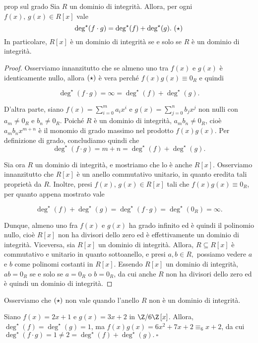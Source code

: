 \begin{prop}[]{prop sul grado}
Sia $R$ un dominio di integrità. Allora, per ogni $f(x),\,g(x)\in R[x]$ vale \[\deg^{\star}(f\cdot g)=\deg^{\star}(f)+\deg^{\star}(g). \ \bf{(\star)}\] In particolare, $R[x]$ è un dominio di integrità se e solo se $R$ è un dominio di integrità.
\end{prop}
\vspace{-4mm}
\begin{proof} Osserviamo innanzitutto che se almeno uno tra $f(x)$ e $g(x)$ è identicamente nullo, 
allora $\bf{(\star)}$ è vera perché $f(x)g(x)\equiv 0_R$ e quindi 

\[\deg^{\star}(f\cdot g)=\infty=\deg^{\star}(f)+\deg^{\star}(g).\] 

\noindent D'altra parte, siano $f(x)=\sum\limits_{i=0}^m a_i x^i$ e $g(x)=\sum\limits_{j=0}^n b_j x^j$ 
non nulli con $a_m\neq 0_R$ e $b_n\neq 0_R$. Poiché $R$ è un dominio di integrità, $a_m b_n\neq 0_R$, 
cioè $a_m b_n x^{m+n}$ è il monomio di grado massimo nel prodotto $f(x)g(x)$. Per definizione di grado, 
concludiamo quindi che \[\deg^{\star}(f\cdot g)=m+n=\deg^{\star}(f)+\deg^{\star}(g).\]

\noindent Sia ora $R$ un dominio di integrità, e mostriamo che lo è anche $R[x]$. 
Osserviamo innanzitutto che $R[x]$ è un anello commutativo unitario, in quanto eredita tali proprietà da $R$. 
Inoltre, presi $f(x),\,g(x)\in R[x]$ tali che $f(x)g(x)\equiv 0_R$, per quanto appena mostrato vale 

\[\deg^{\star}(f)+\deg^{\star}(g)=\deg^{\star}(f\cdot g)=\deg^{\star}(0_R)=\infty.\] 

\noindent Dunque, almeno uno fra $f(x)$ e $g(x)$ ha grado infinito ed è quindi il polinomio nullo, 
cioè $R[x]$ non ha divisori dello zero ed è effettivamente un dominio di integrità.
\vspace{1mm}
\noindent Viceversa, sia $R[x]$ un dominio di integrità. Allora, $R\subseteq R[x]$ è commutativo e unitario in quanto sottoanello, 
e presi $a,b\in R,$ possiamo vedere $a$ e $b$ come polinomi costanti in $R[x]$. Essendo $R[x]$ un dominio di integrità, 
$ab=0_R$ se e solo se $a=0_R$ o $b=0_R$, da cui anche $R$ non ha divisori dello zero ed è quindi un dominio di integrità.
\end{proof}

\noindent Osserviamo che $\bf{(\star)}$ non vale quando l'anello $R$ non è un dominio di integrità.

\begin{exm} 
Siano $f(x)=2x+1$ e $g(x)=3x+2$ in $\Z/6\Z\,[x]$. Allora, $\deg^{\star}(f)=\deg^{\star}(g)=1$, 
ma $f(x)g(x)=6x^2+7x+2\equiv_6 x+2$, da cui $\deg^{\star}(f\cdot g)=1\neq 2=\deg^{\star}(f)+\deg^{\star}(g). \ \square$
\end{exm}

